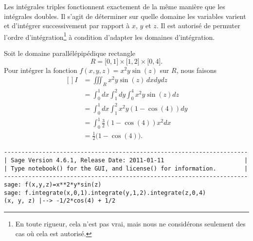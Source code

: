 Les intégrales triples fonctionnent exactement de la même manière que les intégrales doubles. Il s'agit de déterminer sur quelle domaine les variables varient et d'intégrer successivement par rapport à $x$, $y$ et $z$. Il est autorisé de permuter l'ordre d'intégration\footnote{En toute rigueur, cela n'est pas vrai, mais nous ne considérons seulement des cas où cela est autorisé.} à condition d'adapter les domaines d'intégration. 

\begin{example}
    Soit le domaine parallélépipédique rectangle 
    \begin{equation}
        R=\mathopen[ 0 , 1 \mathclose]\times \mathopen[ 1 , 2 \mathclose]\times\mathopen[ 0 , 4 \mathclose].
    \end{equation}
    Pour intégrer la fonction $f(x,y,z)=x^2y\sin(z)$ sur $R$, nous faisons
    \begin{equation}
        \begin{aligned}[]
            I&=\iiint_Rx^2y\sin(z)\,dxdydz\\
            &=\int_0^1dx\int_1^2dy\int_0^4x^2y\sin(z)dz\\
            &=\int_0^1dx\int_1^2 x^2y(1-\cos(4))dy\\
            &=\int_0^1\frac{ 3 }{2}(1-\cos(4))x^2dx\\
            &=\frac{ 1 }{2}\big( 1-\cos(4) \big).
        \end{aligned}
    \end{equation}
    
    \begin{verbatim}
----------------------------------------------------------------------
| Sage Version 4.6.1, Release Date: 2011-01-11                       |
| Type notebook() for the GUI, and license() for information.        |
----------------------------------------------------------------------
sage: f(x,y,z)=x**2*y*sin(z)                                                                                                                                                            
sage: f.integrate(x,0,1).integrate(y,1,2).integrate(z,0,4)                                                                                                                               
(x, y, z) |--> -1/2*cos(4) + 1/2
    \end{verbatim}
\end{example}


